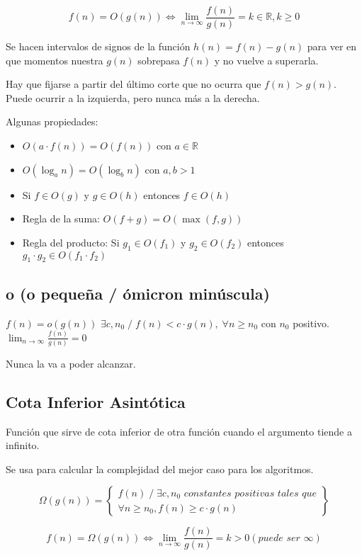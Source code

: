 $$f(n)=O(g(n)) \Leftrightarrow \lim_{n \rightarrow \infty} \frac{f(n)}{g(n)}= k \in \mathbb{R}, k \geq 0$$

Se hacen intervalos de signos de la función $h(n) = f(n)-g(n)$ para ver en que momentos nuestra $g(n)$ sobrepasa $f(n)$ y no vuelve a superarla.

Hay que fijarse a partir del último corte que no ocurra que $f(n) > g(n)$. Puede ocurrir a la izquierda, pero nunca más a la derecha.

Algunas propiedades:
\begin{itemize}
  \item $O(a \cdot f(n))= O(f(n))$ con $a \in \mathbb{R}$
  \item $O(\log_a n) = O(\log_b n)$ con $a,b > 1$
  \item Si $f \in O(g)$ y $g \in O(h)$ entonces $f \in O(h)$
  \item Regla de la suma: $O(f+g)=O(\max(f, g))$
  \item Regla del producto: Si $g_1 \in O(f_1)$ y $g_2 \in O(f_2)$ entonces $g_1 \cdot g_2 \in O(f_1 \cdot f_2)$
\end{itemize}

\subsection{o (o pequeña / ómicron minúscula)}
$f(n)=o(g(n))$ $\exists c, n_0\;/\; f(n)<c\cdot g(n), \; \forall n \geq n_0$ con $n_0$ positivo. $\lim_{n \rightarrow \infty} \frac{f(n)}{g(n)}=0$

Nunca la va a poder alcanzar.

\subsection{Cota Inferior Asintótica}
Función que sirve de cota inferior de otra función cuando el argumento tiende a infinito.

Se usa para calcular la complejidad del mejor caso para los algoritmos.

$$\Omega(g(n))=\left\{\begin{matrix}
  f(n)\;/\;\exists c, n_0 \textit{ constantes positivas tales que}  \\
  \forall n \geq n_0, f(n) \geq c \cdot g(n)
  \end{matrix}\right\}$$

$$f(n)=\Omega(g(n)) \Leftrightarrow \lim_{n \rightarrow \infty} \frac{f(n)}{g(n)}= k > 0 (\textit{puede ser }\infty)$$

